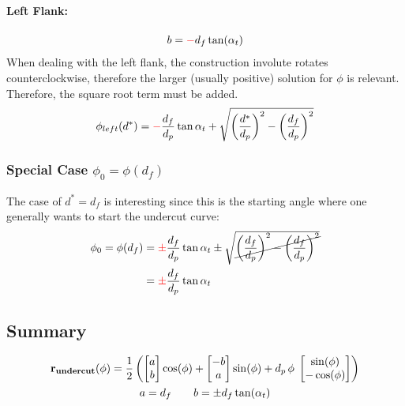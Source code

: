 \paragraph{Left Flank:}
\begin{equation*}
b = \textcolor{red}{-}d_f\tan(\alpha_t)
\end{equation*}
When dealing with the left flank, the construction involute rotates counterclockwise, therefore the larger (usually positive) solution for $\phi$ is relevant. Therefore, the square root term must be added.
\begin{equation}
    \phi_{left}(d^*) = \textcolor{red}{-}\frac{d_f}{d_p}\tan{\alpha_t} + \sqrt{\left(\frac{d^*}{d_p}\right)^2 - \left(\frac{d_f}{d_p}\right)^2}
\end{equation}


\subsubsection{Special Case \texorpdfstring{$\phi_0 = \phi(d_f)$}{φ₀ = φ(dₓ)}}
The case of $d^* = d_f$ is interesting since this is the starting angle where one generally wants to start the undercut curve:
\begin{align}
    \phi_0 = \phi(d_f)
        &=  \textcolor{red}{\pm}\frac{d_f}{d_p}\tan{\alpha_t} \pm \sqrt{\cancel{\left(\frac{d_f}{d_p}\right)^2- \left(\frac{d_f}{d_p}\right)^2}} \nonumber\\
        &= \textcolor{red}{\pm}\frac{d_f}{d_p}\tan{\alpha_t}
\end{align}

\subsection{Summary}
\begin{equation}
\begin{gathered}
    \vb{r_{undercut}}(\phi) = \frac{1}{2} \left(
        \begin{bmatrix}
            a \\ b
        \end{bmatrix} \cos(\phi)
        + \begin{bmatrix}
            -b \\ a
        \end{bmatrix} \sin(\phi)
        + d_p\,\phi\; \begin{bmatrix}
            \sin(\phi) \\ - \cos(\phi)
        \end{bmatrix}
    \right)
\\
    a = d_f \quad\quad b = \pm d_f\tan(\alpha_t)
\end{gathered}
\end{equation}

